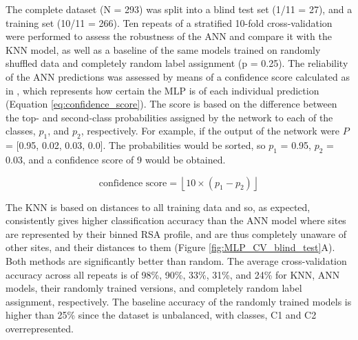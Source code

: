 The complete dataset (N = 293) was split into a blind test set (1/11 = 27), and a training set (10/11 = 266). Ten repeats of a stratified 10-fold cross-validation were performed to assess the robustness of the ANN and compare it with the KNN model, as well as a baseline of the same models trained on randomly shuffled data and completely random label assignment (p = 0.25). The reliability of the ANN predictions was assessed by means of a confidence score calculated as in \cite{CUFF_2000_PROFILES}, which represents how certain the MLP is of each individual prediction (Equation \ref{eq:confidence_score}). The score is based on the difference between the top- and second-class probabilities assigned by the network to each of the classes, $p_{1}$, and $p_{2}$, respectively. For example, if the output of the network were $P$ = [0.95, 0.02, 0.03, 0.0]. The probabilities would be sorted, so $p_{1}$ = 0.95, $p_{2}$ = 0.03, and a confidence score of 9 would be obtained.

\begin{equation}
\text{confidence score} = \left\lfloor 10 \times (p_1 - p_2) \right\rfloor
\label{eq:confidence_score}
\end{equation}

The KNN is based on distances to all training data and so, as expected, consistently gives higher classification accuracy than the ANN model where sites are represented by their binned RSA profile, and are thus completely unaware of other sites, and their distances to them (Figure \ref{fig:MLP_CV_blind_test}A). Both methods are significantly better than random. The average cross-validation accuracy across all repeats is of 98\%, 90\%, 33\%, 31\%, and 24\% for KNN, ANN models, their randomly trained versions, and completely random label assignment, respectively. The baseline accuracy of the randomly trained models is higher than 25\% since the dataset is unbalanced, with classes, C1 and C2 overrepresented.

